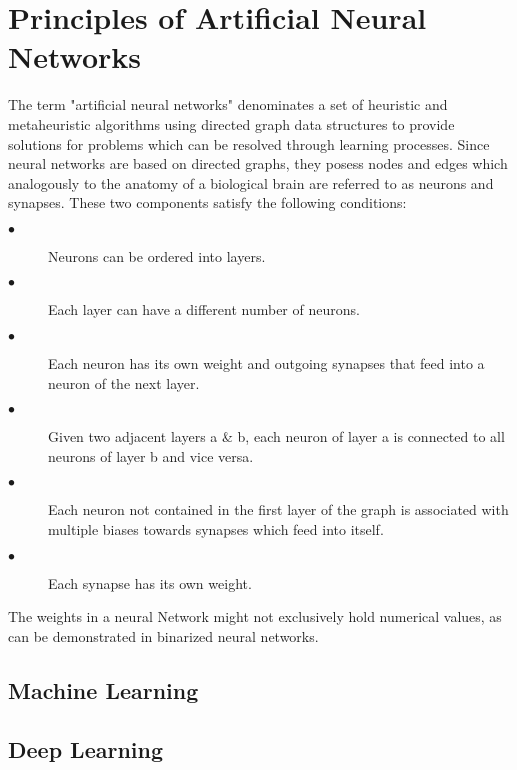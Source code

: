 \chapter{Principles of Artificial Neural Networks}

The term "artificial neural networks" denominates a set of heuristic and metaheuristic algorithms using directed graph data structures to provide solutions for problems which can be resolved through learning processes. Since neural networks are based on directed graphs, they posess nodes and edges which analogously to the anatomy of a biological brain are referred to as neurons and synapses. These two components satisfy the following conditions:
\begin{description}
\item[$\bullet$] Neurons can be ordered into layers.
\item[$\bullet$] Each layer can have a different number of neurons.
\item[$\bullet$] Each neuron has its own weight and outgoing synapses that feed into a neuron of the next layer.
\item[$\bullet$] Given two adjacent layers a \& b, each neuron of layer a is connected to all neurons of layer b and vice versa. 
\item[$\bullet$] Each neuron not contained in the first layer of the graph is associated with multiple biases towards synapses which feed into itself.
\item[$\bullet$] Each synapse has its own weight.
\end{description}
The weights in a neural Network might not exclusively hold numerical values, as can be demonstrated in binarized neural networks.         
\section{Machine Learning}

\Blindtext[4][1]

\section{Deep Learning}

\Blindtext[4][1]

